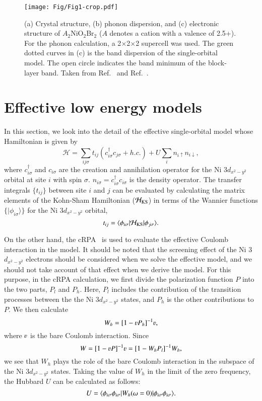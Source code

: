 \documentclass[%
 aip,
 amsmath,amssymb,
 reprint,%
]{revtex4-1}
\newcommand{\cyan}[1]{\textcolor{black}{#1}}
\begin{document}
\begin{figure}
\texttt{[image: Fig/Fig1-crop.pdf]}
\caption{(a) Crystal structure, (b) phonon dispersion, and (c) electronic structure of $A_2$NiO$_2$Br$_2$ ($A$ denotes a cation with a valence of 2.5+). For the phonon calculation, a 2$\times$2$\times$2 supercell was used. The green dotted curves in (c) is the band dispersion of the single-orbital model. The open circle indicates the band minimum of the block-layer band. Taken from Ref.~ and Ref.~.}
\label{Fig3}
\end{figure}

\section{Effective low energy models\label{sec:3}}
In this section, we look into the detail of the effective single-orbital model whose Hamiltonian is given by
\[
{\mathcal H}=\sum_{ij\sigma}t_{ij}(c^\dagger_{i\sigma}c_{j\sigma}+h.c.)+U\sum_i n_{i\uparrow}n_{i\downarrow},
\]
where $c^\dagger_{i\sigma}$ and $c_{i\sigma}$ are the creation and annihilation operator for the Ni 3$d_{x^2-y^2}$ orbital at site $i$ with spin $\sigma$. $n_{i\sigma}=c^\dagger_{i\sigma}c_{i\sigma}$ is the density operator. The transfer integrals $\{ t_{ij}\}$ between site $i$ and $j$ can be evaluated by calculating the matrix elements of the Kohn-Sham Hamiltonian (${\mathcal H}_{\rm KS}$) in terms of the Wannier functions $\{|\phi_{i\sigma}\rangle\}$ for the Ni 3$d_{x^2-y^2}$ orbital,
\[
t_{ij}=\langle \phi_{i\sigma}| {\mathcal H}_{\rm KS}|\phi_{j\sigma}\rangle.
\]

On the other hand, the cRPA~\cite{Aryasetiawan_2004} is used to evaluate the effective Coulomb interaction in the model. It should be noted that the screening effect of the Ni 3$d_{x^2-y^2}$ electrons should be considered when we solve the effective model, and we should not take account of that effect when we derive the model. For this purpose, in the cRPA calculation, we first divide the polarization function $P$ into the two parts, $P_l$ and $P_h$. Here, $P_l$ includes the contribution of the transition processes between the the Ni 3$d_{x^2-y^2}$ states, and $P_h$ is the other contributions to $P$. We then calculate
\[
W_h=[1- \varv P_h]^{-1} \varv,
\]
where $\varv$ is the bare Coulomb interaction. Since
\[
W=[1-\varv P]^{-1}\varv=[1-W_hP_l]^{-1}W_h,
\]
we see that $W_h$ plays the role of the bare Coulomb interaction in the subspace of the Ni 3$d_{x^2-y^2}$ states. Taking the value of $W_h$ in the limit of the zero frequency, the Hubbard $U$ can be calculated as follows:
\[
\cyan{U=\langle \phi_{i\sigma} \phi_{i\sigma} |W_h(\omega =0)|\phi_{i\sigma}\phi_{i\sigma}\rangle.}
\]
\end{document}
